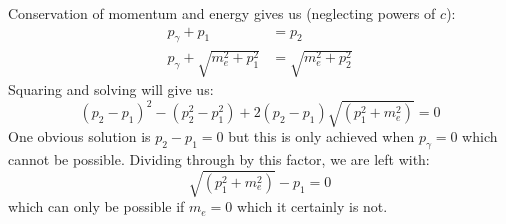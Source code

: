 \begin{sol}
Conservation of momentum and energy gives us (neglecting powers of $c$):
\begin{align*}
    p_\gamma + p_1 &= p_2 \\
    p_\gamma + \sqrt{m_e^2+p_1^2} &=  \sqrt{m_e^2+p_2^2}
\end{align*}
Squaring and solving will give us:
$$
(p_{2}-p_{1})^{2} - (p_{2}^{2}-p_{1}^{2}) +
2(p_{2}-p_{1})\sqrt{(p_{1}^{2}+m_{e}^{2})} = 0
$$
One obvious solution is $p_2-p_1=0$ but this is only achieved when $p_\gamma=0$ which cannot be possible. Dividing through by this factor, we are left with:
$$
\sqrt{(p_{1}^{2}+m_{e}^{2})} - p_{1} =0
$$
which can only be possible if $m_e = 0$ which it certainly is not.
\end{sol}